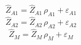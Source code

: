 \begin{dmath}
{{\hat{Z}_{A1}}}={{\hat{Z}_{A1}}}\, {{\rho_{A1}}}+{{\varepsilon_{A1}}}
\end{dmath}
\begin{dmath}
{{\hat{Z}_{A2}}}={{\hat{Z}_{A2}}}\, {{\rho_{A2}}}+{{\varepsilon_{A2}}}
\end{dmath}
\begin{dmath}
{{\hat{Z}_M}}={{\hat{Z}_M}}\, {{\rho_{M}}}+{{\varepsilon_{M}}}
\end{dmath}
